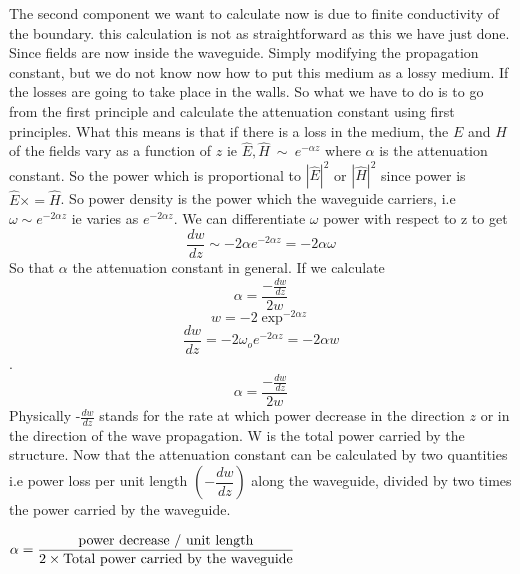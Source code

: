 The second component we want to calculate now is due to finite conductivity of the boundary. this calculation is not as straightforward as this we have just done. Since fields are now inside the waveguide. Simply modifying the propagation constant, but we do not know now how to put this medium as a lossy medium. If the losses are going to take place in the walls. So what we have to do is to go from the first principle and calculate the attenuation constant using first principles. What this means is that if there is a loss in the medium, the $E$ and $H$ of the fields vary as a function of $z$ ie $ {\hat{E}}, {\hat{H}} \ \sim\ e^{-\alpha z}$ where $\alpha$ is the attenuation constant. So the power which is proportional to $|{\hat{E}}|^{2}$ or $|{\hat{H}}|^{2}$ since power is ${\hat{E}}\times={\hat{H}}$. So power density is the power which the waveguide carriers, i.e $\omega\sim e^{-2\alpha z}$ ie varies as $e^{-2\alpha z}$. We can differentiate $\omega$ power with respect to z to get $$\dfrac{dw}{dz}\sim-2\alpha e^{-2\alpha z} = -2\alpha\omega$$ So that $\alpha$ the attenuation constant in general. If we calculate $$\alpha = \dfrac{-\frac{dw}{dz}}{2w}$$ $$w = -2\exp^{-2\alpha z}$$ $$\frac{dw}{dz} = -2\omega_{o} e^{-2\alpha z} = -2\alpha w$$. $$\alpha = \dfrac{-\frac{dw}{dz}}{2w}$$ Physically -$\frac{dw}{dz}$ stands for the rate at which power decrease in the direction $z$ or in the direction of the wave propagation. W is the total power carried by the structure. Now that the attenuation constant can be calculated by two quantities i.e power loss per unit length $(-\dfrac{dw}{dz})$  along the waveguide, divided by two times the power carried by the waveguide.

$\alpha = \dfrac{\textnormal{power decrease / unit length}}{2\times \textnormal{Total power carried by the waveguide}}$
